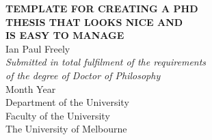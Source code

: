 %
%
%
\begin{titlepage}
\begin{center}
%
{}
\vspace*{1cm}
{\bf\LARGE      TEMPLATE FOR CREATING A PHD        }\\ \vspace{0.3cm}
{\bf\LARGE       THESIS THAT LOOKS NICE AND        }\\ \vspace{0.3cm}
{\bf\LARGE           IS EASY TO MANAGE             }\\ \vspace{0.3cm}
{}
\vspace{5cm}
{\LARGE            Ian Paul Freely             }\\
\vspace{5cm}
{\em\large Submitted in total fulfilment of the requirements}\\ \vspace{0.1cm}
{\em\large       of the degree of Doctor of Philosophy      }\\
\vspace{2cm}
{\Large                      Month Year                  }\\
\vspace{2cm}
{\Large               Department of the University              }\\ \vspace{0.2cm}
{\Large                 Faculty of the University               }\\ \vspace{0.2cm}
{\Large                The University of Melbourne              }\\ \vspace{0.2cm}
\end{center}
\end{titlepage}
\cleardoublepage                    
%
%